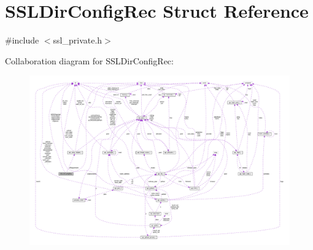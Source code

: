 \hypertarget{structSSLDirConfigRec}{}\section{S\+S\+L\+Dir\+Config\+Rec Struct Reference}
\label{structSSLDirConfigRec}


{\ttfamily \#include $<$ssl\+\_\+private.\+h$>$}



Collaboration diagram for S\+S\+L\+Dir\+Config\+Rec\+:
\nopagebreak
\begin{figure}[H]
\begin{center}
\leavevmode
\includegraphics[width=350pt]{structSSLDirConfigRec__coll__graph}
\end{center}
\end{figure}
